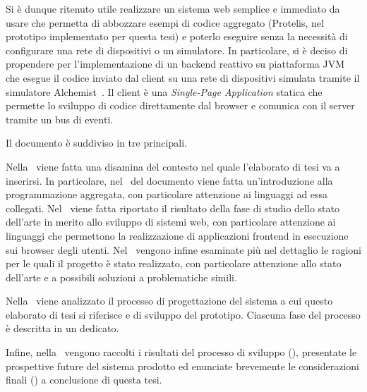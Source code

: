 Si è dunque ritenuto utile realizzare un sistema web semplice e immediato da usare che permetta di abbozzare esempi di codice aggregato
(Protelis, nel prototipo implementato per questa tesi) e poterlo eseguire senza la necessità di configurare una rete di dispositivi o un simulatore.
In particolare, si è deciso di propendere per l'implementazione di un backend reattivo su piattaforma JVM che esegue il codice inviato dal client su una rete di dispositivi simulata tramite il simulatore Alchemist~\cite{alchemist-jos2013}.
Il client è una \emph{Single-Page Application} statica che permette lo sviluppo di codice direttamente dal browser e comunica con il server tramite un bus di eventi.

\medskip

Il documento è suddiviso in tre  principali.

Nella~ viene fatta una disamina del contesto nel quale l'elaborato di tesi va a inserirsi.
In particolare, nel~ del documento viene fatta un'introduzione alla programmazione aggregata, con particolare attenzione ai linguaggi ad essa collegati.
Nel~ viene fatta riportato il risultato della fase di studio dello stato dell'arte in merito allo sviluppo di sistemi web,
con particolare attenzione ai linguaggi che permettono la realizzazione di applicazioni frontend in esecuzione sui browser degli utenti.
Nel~ vengono infine esaminate più nel dettaglio le ragioni per le quali il progetto è stato realizzato,
con particolare attenzione allo stato dell'arte e a possibili soluzioni a problematiche simili.

Nella~ viene analizzato il processo di progettazione del sistema a cui questo elaborato di tesi si riferisce e di sviluppo del prototipo.
Ciascuna fase del processo è descritta in un  dedicato.

Infine, nella~ vengono raccolti i risultati del processo di sviluppo (), presentate le prospettive future del sistema prodotto ed enunciate brevemente le considerazioni finali () a conclusione di questa tesi.
